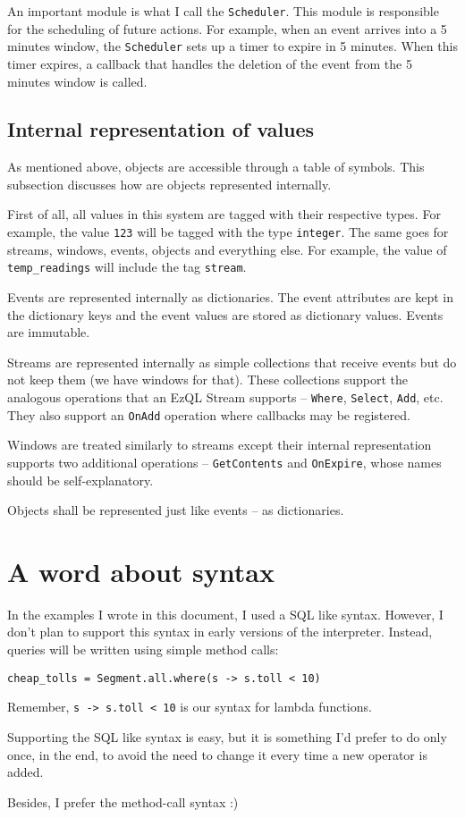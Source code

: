 \documentclass{report}
\begin{document}
An important module is what I call the \verb=Scheduler=. This module
is responsible for the scheduling of future actions. For example, when
an event arrives into a 5 minutes window, the \verb=Scheduler= sets up
a timer to expire in 5 minutes. When this timer expires, a callback
that handles the deletion of the event from the 5 minutes window is
called.

\section{Internal representation of values}

As mentioned above, objects are accessible through a table of
symbols. This subsection discusses how are objects represented
internally.

First of all, all values in this system are tagged with their
respective types. For example, the value \verb=123= will be tagged
with the type \verb=integer=. The same goes for streams, windows,
events, objects and everything else. For example, the value of
\verb=temp_readings= will include the tag \verb=stream=.

Events are represented internally as dictionaries. The event
attributes are kept in the dictionary keys and the event values are
stored as dictionary values. Events are immutable.

Streams are represented internally as simple collections that receive
events but do not keep them (we have windows for that). These
collections support the analogous operations that an EzQL Stream
supports -- \verb=Where=, \verb=Select=, \verb=Add=, etc. They also
support an \verb=OnAdd= operation where callbacks may be registered.

Windows are treated similarly to streams except their internal
representation supports two additional operations --
\verb=GetContents= and \verb=OnExpire=, whose names should be
self-explanatory.

Objects shall be represented just like events -- as dictionaries.


\chapter{A word about syntax}

In the examples I wrote in this document, I used a SQL like
syntax. However, I don't plan to support this syntax in early versions
of the interpreter. Instead, queries will be written using simple
method calls:

\begin{verbatim}
cheap_tolls = Segment.all.where(s -> s.toll < 10)
\end{verbatim}

Remember, \verb=s -> s.toll < 10= is our syntax for lambda
functions.

Supporting the SQL like syntax is easy, but it is something I'd prefer
to do only once, in the end, to avoid the need to change it every time
a new operator is added.

Besides, I prefer the method-call syntax :)
\end{document}
